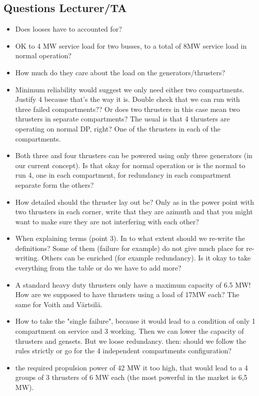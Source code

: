 \subsection*{Questions Lecturer/TA}

\begin{itemize}
    \item Does looses have to accounted for?
    \item OK to 4 MW service load for two busses, to a total of 8MW service load in normal operation? 
    \item How much do they care about the load on the generators/thrusters?
    \item Minimum reliability would suggest we only need either two compartments. Justify 4 because that's the way it is. Double check that we can run with three failed compartments?? Or does two thrusters in this case mean two thrusters in separate compartments?
    \checkmark The usual is that 4 thrusters are operating on normal DP, right? One of the thrusters in each of the compartments. 
    \item Both three and four thrusters can be powered using only three generators (in our current concept). Is that okay for normal operation or is the normal to run 4, one in each compartment, for redundancy in each compartment separate form the others?
    \item How detailed should the thruster lay out be? Only as in the power point with two thrusters in each corner, write that they are azimuth and that you might want to make sure they are not interfering with each other?
    \item When explaining terms (point 3). In to what extent should we re-write the definitions? Some of them (failure for example) do not give much place for re-writing. Others can be enriched (for example redundancy). Is it okay to take everything from the table or do we have to add more?
    \item A standard heavy duty thrusters only have a maximum capacity of 6.5 MW! How are we supposed to have thrusters using a load of 17MW each? The same for Voith and Värtsilä.  
    \item How to take the "single failure", because it would lead to a condition of only 1 compartment on service and 3 working. Then we can lower the capacity of thrusters and gensets. But we loose redundancy. then: should we follow the rules strictly or go for the 4 independent compartments configuration?
    \item the required propulsion power of 42 MW it too high, that would lead to a 4 groups of 3 thrusters of 6 MW each (the most powerful in the market is 6,5 MW).

\end{itemize}

